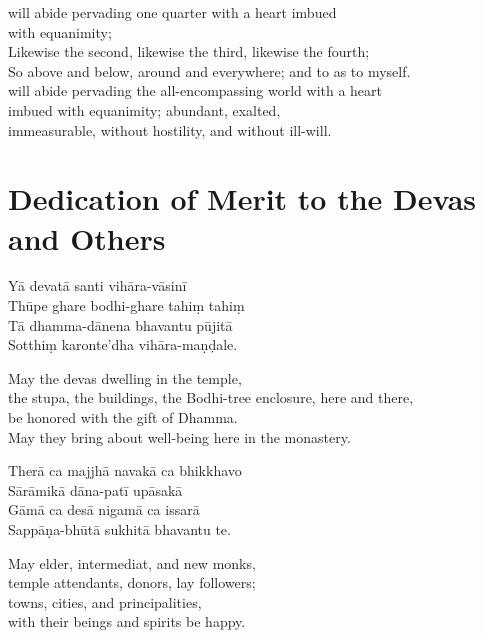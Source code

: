  will abide pervading one quarter with a heart imbued\\
\vin with equanimity;\\
Likewise the second, likewise the third, likewise the fourth;\\
So above and below, around and everywhere; and to  as to myself.\\
 will abide pervading the all-encompassing world with a heart \\
\vin imbued with equanimity; abundant, exalted,\\
\vin immeasurable, without hostility, and without ill-will.

\section{Dedication of Merit to the Devas and Others}



\begin{leader}
\end{leader}


Yā devatā santi vihāra-vāsinī\\
Thūpe ghare bodhi-ghare tahiṃ tahiṃ\\
Tā dhamma-dānena bhavantu pūjitā\\
Sotthiṃ karonte'dha vihāra-maṇḍale.

\begin{english}
  May the devas dwelling in the temple,\\
  the stupa, the buildings, the Bodhi-tree enclosure, here and there,\\
  be honored with the gift of Dhamma.\\
  May they bring about well-being here in the monastery.
\end{english}

Therā ca majjhā navakā ca bhikkhavo\\
Sārāmikā dāna-patī upāsakā\\
Gāmā ca desā nigamā ca issarā\\
Sappāṇa-bhūtā sukhitā bhavantu te.

\begin{english}
  May elder, intermediat, and new monks,\\
  temple attendants, donors, lay followers;\\
  towns, cities, and principalities,\\
  with their beings and spirits be happy.
\end{english}

